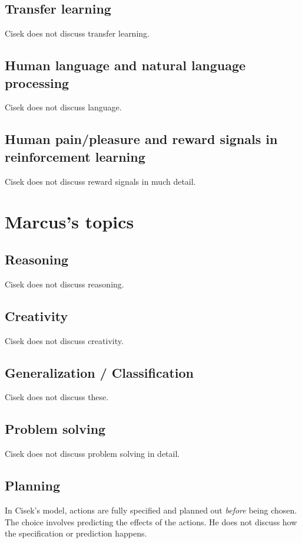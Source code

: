 \documentclass[10pt,a4paper]{article}
\begin{document}
\subsection{Transfer learning}
Cisek does not discuss transfer learning.

\subsection{Human language and natural language processing}
Cisek does not discuss language.

\subsection{Human pain/pleasure and reward signals in reinforcement learning}
Cisek does not discuss reward signals in much detail.

\section{Marcus's topics}

\subsection{Reasoning}
Cisek does not discuss reasoning.

\subsection{Creativity}
Cisek does not discuss creativity.

\subsection{Generalization / Classification}
Cisek does not discuss these.

\subsection{Problem solving}
Cisek does not discuss problem solving in detail.

\subsection{Planning}
In Cisek's model, actions are fully specified and planned out \emph{before} being chosen. The choice involves predicting the effects of the actions. He does not discuss how the specification or prediction happens.
\end{document}
